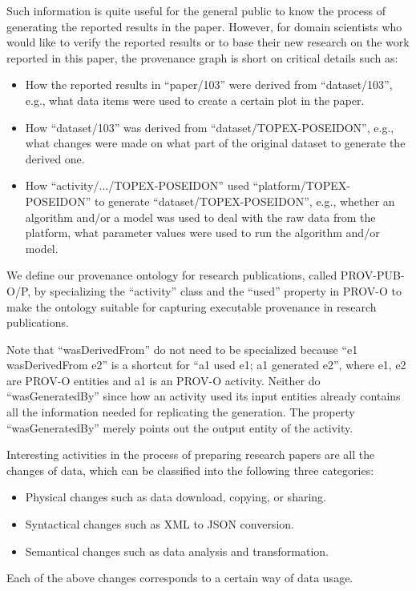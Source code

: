 Such information is quite useful for the general public to know the process of generating the reported results in the paper. However, for domain scientists who would like to verify the reported results or to base their new research on the work reported in this paper, the provenance graph is short on critical details such as:
\begin{itemize}
	\item How the reported results in ``paper/103'' were derived from ``dataset/103'', e.g., what data items were used to create a certain plot in the paper.
	\item How ``dataset/103'' was derived from ``dataset/TOPEX-POSEIDON'', e.g., what changes were made on what part of the original dataset to generate the derived one.
	\item How ``activity/.../TOPEX-POSEIDON'' used ``platform/TOPEX-POSEIDON'' to generate ``dataset/TOPEX-POSEIDON'', e.g., whether an algorithm and/or a model was used to deal with the raw data from the platform, what parameter values were used to run the algorithm and/or model.
\end{itemize} 
We define our provenance ontology for research publications, called PROV-PUB-O/P, by specializing the ``activity'' class and the ``used'' property in PROV-O to make the ontology suitable for capturing executable provenance in research publications.

Note that ``wasDerivedFrom'' do not need to be specialized because ``e1 wasDerivedFrom e2'' is a shortcut for ``a1 used e1; a1 generated e2'', where e1, e2 are PROV-O entities and a1 is an PROV-O activity. Neither do ``wasGeneratedBy'' since how an activity used its input entities already contains all the information needed for replicating the generation. The property ``wasGeneratedBy'' merely points out the output entity of the activity.

Interesting activities in the process of preparing research papers are all the changes of data, which can be classified into the following three categories:
\begin{itemize}
	\item Physical changes such as data download, copying, or sharing.
	\item Syntactical changes such as XML to JSON conversion.
	\item Semantical changes such as data analysis and transformation.
\end{itemize}
Each of the above changes corresponds to a certain way of data usage.

